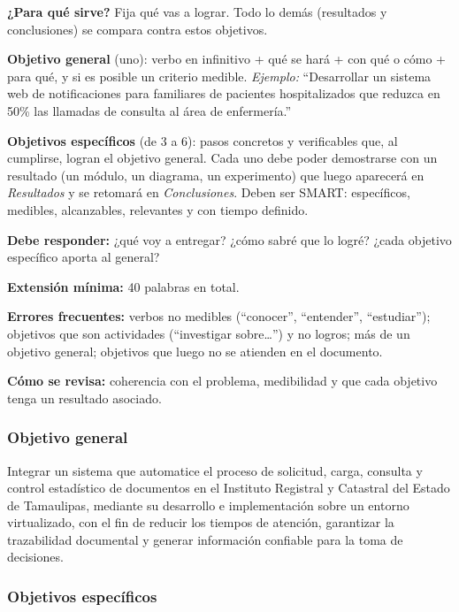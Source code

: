 \begin{guia}
\textbf{¿Para qué sirve?} Fija qué vas a lograr. Todo lo demás (resultados y conclusiones) se compara contra estos objetivos.

\textbf{Objetivo general} (uno): verbo en infinitivo + qué se hará + con qué o cómo + para qué, y si es posible un criterio
medible. \emph{Ejemplo:} ``Desarrollar un sistema web de notificaciones para familiares de pacientes hospitalizados que
reduzca en 50\% las llamadas de consulta al área de enfermería.''

\textbf{Objetivos específicos} (de 3 a 6): pasos concretos y verificables que, al cumplirse, logran el objetivo general.
Cada uno debe poder demostrarse con un resultado (un módulo, un diagrama, un experimento) que luego aparecerá en
\emph{Resultados} y se retomará en \emph{Conclusiones}. Deben ser SMART: específicos, medibles, alcanzables, relevantes y
con tiempo definido.

\textbf{Debe responder:} ¿qué voy a entregar? ¿cómo sabré que lo logré? ¿cada objetivo específico aporta al general?

\textbf{Extensión mínima:} 40 palabras en total.

\textbf{Errores frecuentes:} verbos no medibles (``conocer'', ``entender'', ``estudiar''); objetivos que son actividades
(``investigar sobre\ldots'') y no logros; más de un objetivo general; objetivos que luego no se atienden en el documento.

\textbf{Cómo se revisa:} coherencia con el problema, medibilidad y que cada objetivo tenga un resultado asociado.
\end{guia}

\subsubsection{Objetivo general} \label{subsec:objetivo_general}

Integrar un sistema que automatice el proceso de solicitud, carga, consulta y control estadístico de documentos en el Instituto Registral y Catastral del Estado de Tamaulipas, mediante su desarrollo e implementación sobre un entorno virtualizado, con el fin de reducir los tiempos de atención, garantizar la trazabilidad documental y generar información confiable para la toma de decisiones.

\subsubsection{Objetivos específicos} \label{subsec:objetivos_especificos}

